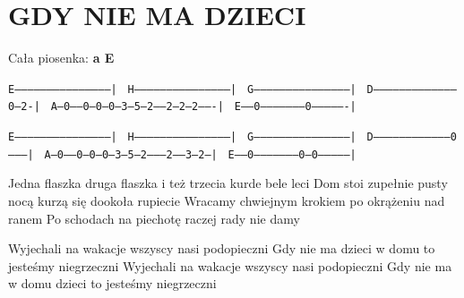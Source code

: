 \documentclass[../../../songbook.tex]{subfiles}
\begin{document}
\TabPositions{8cm} %
\section*{GDY NIE MA DZIECI}
\vspace{0.5cm}
Cała piosenka: {\color{red}\textbf{a E } } \newline

 \texttt{E--------------------------------------------| } 	\newline 	
 \texttt{H--------------------------------------------|	}	\newline 	
 \texttt{G--------------------------------------------|	}	\newline 	
 \texttt{D---------------------------------------0--2-|	}	\newline 	
 \texttt{A--0------0--0--0--3--5--2-----2--2--2-------|	}	\newline 	
 \texttt{E-----0---------------------0----------------|	}	\newline 
 
\texttt{E--------------------------------------------|	}	\newline 	
\texttt{H--------------------------------------------|	}	\newline 	
\texttt{G--------------------------------------------|	}	\newline 	
\texttt{D-----------------------------------0--------|	}	\newline 	
\texttt{A--0-----0--0--0--3--5--2--------2-----3--2--|	}	\newline 	
\texttt{E-----0--------------------0--0--------------|	}	\newline 	

Jedna flaszka druga flaszka i też trzecia kurde bele leci  \newline  	
Dom stoi zupełnie pusty nocą kurzą się dookoła rupiecie		\newline
Wracamy chwiejnym krokiem po okrążeniu nad ranem			\newline
Po schodach na piechotę raczej rady nie damy				\newline

\-\hspace{1cm} Wyjechali na wakacje wszyscy nasi podopieczni		\newline
\-\hspace{1cm} Gdy nie ma dzieci w domu to jesteśmy niegrzeczni		\newline
\-\hspace{1cm} Wyjechali na wakacje wszyscy nasi podopieczni		\newline
\-\hspace{1cm} Gdy nie ma w domu dzieci to jesteśmy niegrzeczni		\newline
\end{document}
